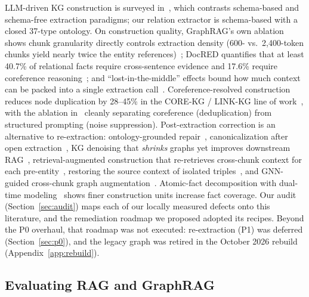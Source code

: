 LLM-driven KG construction is surveyed in~\cite{bian2025kgsurvey}, which
contrasts schema-based and schema-free extraction paradigms; our relation
extractor is schema-based with a closed 37-type ontology. On construction
quality, GraphRAG's own ablation shows chunk granularity directly controls
extraction density (600- vs.\ 2{,}400-token chunks yield nearly twice the
entity references)~\cite{edge2024graphrag}; DocRED quantifies that at
least 40.7\% of relational facts require cross-sentence evidence and
17.6\% require coreference reasoning~\cite{yao2019docred}; and
``lost-in-the-middle'' effects bound how much context can be packed into a
single extraction call~\cite{liu2024lost}. Coreference-resolved
construction reduces node duplication by 28--45\% in the CORE-KG /
LINK-KG line of work~\cite{meher2025corekg,meher2025insidecorekg,%
meher2025linkkg}, with the ablation in~\cite{meher2025insidecorekg}
cleanly separating coreference (deduplication) from structured prompting
(noise suppression). Post-extraction correction is an alternative to
re-extraction: ontology-grounded repair~\cite{loconte2026betterlater},
canonicalization after open extraction~\cite{zhang2024edc}, KG denoising
that \emph{shrinks} graphs yet improves downstream RAG~\cite{zheng2025lessismore},
retrieval-augmented construction that re-retrieves cross-chunk context for
each pre-entity~\cite{zhang2025rakg}, restoring the source context of
isolated triples~\cite{huang2025tcrqf}, and GNN-guided cross-chunk graph
augmentation~\cite{zhang2026crossaug}. Atomic-fact decomposition with
dual-time modeling~\cite{lairgi2025atom} shows finer construction units
increase fact coverage. Our audit (Section~\ref{sec:audit}) maps each of
our locally measured defects onto this literature, and the remediation
roadmap we proposed adopted its recipes. Beyond the P0 overhaul, that
roadmap was not executed: re-extraction (P1) was deferred
(Section~\ref{sec:p0}), and the legacy graph was retired in the October
2026 rebuild (Appendix~\ref{app:rebuild}).

\subsection{Evaluating RAG and GraphRAG}

